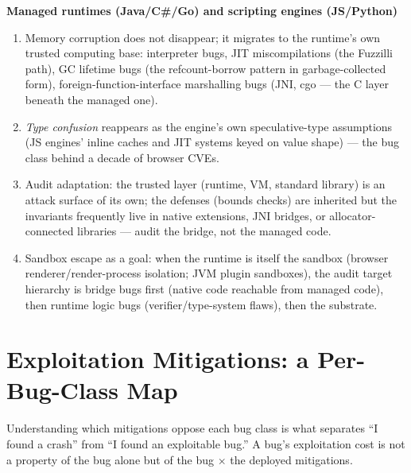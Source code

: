 \documentclass[12pt]{Training}
\begin{document}
\textbf{Managed runtimes (Java/C\#/Go) and scripting engines (JS/Python)}
\begin{enumerate}
    \item Memory corruption does not disappear; it migrates to the runtime's own trusted computing base: interpreter bugs, JIT miscompilations (the Fuzzilli path), GC lifetime bugs (the refcount-borrow pattern in garbage-collected form), foreign-function-interface marshalling bugs (JNI, cgo --- the C layer beneath the managed one).
    \item \emph{Type confusion} reappears as the engine's own speculative-type assumptions (JS engines' inline caches and JIT systems keyed on value shape) --- the bug class behind a decade of browser CVEs.
    \item Audit adaptation: the trusted layer (runtime, VM, standard library) is an attack surface of its own; the defenses (bounds checks) are inherited but the invariants frequently live in native extensions, JNI bridges, or allocator-connected libraries --- audit the bridge, not the managed code.
    \item Sandbox escape as a goal: when the runtime is itself the sandbox (browser renderer/render-process isolation; JVM plugin sandboxes), the audit target hierarchy is bridge bugs first (native code reachable from managed code), then runtime logic bugs (verifier/type-system flaws), then the substrate.
\end{enumerate}


\section*{Exploitation Mitigations: a Per-Bug-Class Map}
Understanding which mitigations oppose each bug class is what separates ``I found a crash'' from ``I found an exploitable bug.'' A bug's exploitation cost is not a property of the bug alone but of the bug $\times$ the deployed mitigations.
\end{document}
